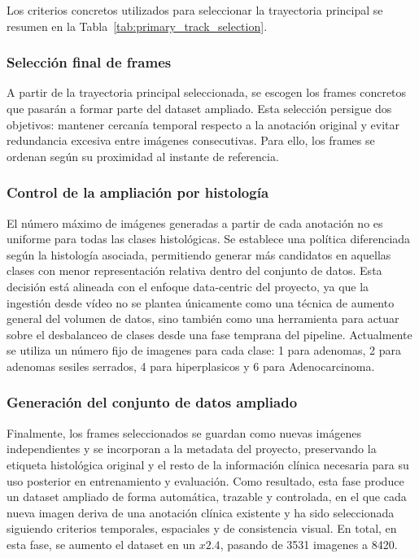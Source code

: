 ﻿\documentclass[10pt,a4paper,twocolumn,twoside]{article}
\begin{document}
Los criterios concretos utilizados para seleccionar la trayectoria principal se resumen en la Tabla~\ref{tab:primary_track_selection}.

\subsubsection{Selección final de frames}
A partir de la trayectoria principal seleccionada, se escogen los frames concretos que pasarán a formar parte del dataset ampliado. Esta selección persigue dos objetivos: mantener cercanía temporal respecto a la anotación original y evitar redundancia excesiva entre imágenes consecutivas. Para ello, los frames se ordenan según su proximidad al instante de referencia.

\subsubsection{Control de la ampliación por histología}

El número máximo de imágenes generadas a partir de cada anotación no es uniforme para todas las clases histológicas. Se establece una política diferenciada según la histología asociada, permitiendo generar más candidatos en aquellas clases con menor representación relativa dentro del conjunto de datos. Esta decisión está alineada con el enfoque data-centric del proyecto, ya que la ingestión desde vídeo no se plantea únicamente como una técnica de aumento general del volumen de datos, sino también como una herramienta para actuar sobre el desbalanceo de clases desde una fase temprana del pipeline. Actualmente se utiliza un número fijo de imagenes para cada clase: 1 para adenomas, 2 para adenomas sesiles serrados, 4 para hiperplasicos y 6 para Adenocarcinoma.

\subsubsection{Generación del conjunto de datos ampliado}
Finalmente, los frames seleccionados se guardan como nuevas imágenes independientes y se incorporan a la metadata del proyecto, preservando la etiqueta histológica original y el resto de la información clínica necesaria para su uso posterior en entrenamiento y evaluación. Como resultado, esta fase produce un dataset ampliado de forma automática, trazable y controlada, en el que cada nueva imagen deriva de una anotación clínica existente y ha sido seleccionada siguiendo criterios temporales, espaciales y de consistencia visual.
En total, en esta fase, se aumento el dataset en un $x2.4$, pasando de 3531 imagenes a 8420.
\end{document}
